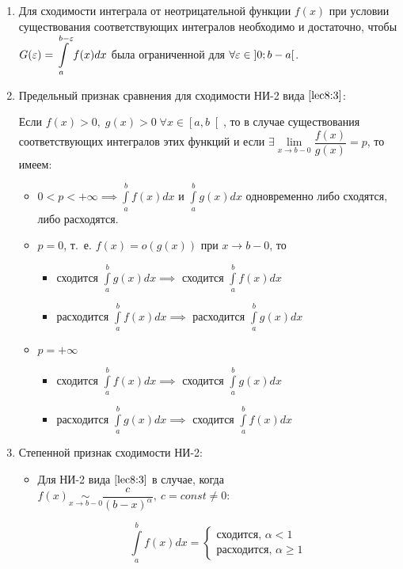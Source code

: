 \documentclass[../../main.tex]{subfiles}
\begin{document}
\begin{enumerate}
 \item Для сходимости интеграла от неотрицательной функции $f(x)$ при 
 условии существования соответствующих интегралов необходимо и 
 достаточно, чтобы $G(\varepsilon) = \displaystyle\int\limits_{a}^{b 
 - \varepsilon}f(x)dx$ была ограниченной для $\forall \varepsilon \in 
 \left]0; b - a\right[$.
 
 \item Предельный признак сравнения для сходимости НИ-2 вида 
 $\eqref{lec8:3}$:
 
 Если $f(x) > 0,\; g(x) > 0\; \forall x \in \left[a, b\right[$, то в случае 
 существования соответствующих интегралов этих функций и если 
 $\exists \underset{x \to b - 
 0}\lim\dfrac{f(x)}{g(x)} = p$, то имеем:
 \begin{itemize}
  \item[а)] $0 < p < +\infty \implies \displaystyle\int\limits_{a}^{b}f(x)dx$ 
  и $\displaystyle\int\limits_{a}^{b}g(x)dx$ одновременно либо сходятся, либо 
  расходятся.
  \item[б)] $p = 0$, т.~е. $f(x) = o(g(x))$ при $x \to b - 0$, то
  \begin{itemize}
   \item сходится $\displaystyle\int\limits_{a}^{b}g(x)dx \implies $ 
   сходится $\displaystyle\int\limits_{a}^{b}f(x)dx$
   \item расходится $\displaystyle\int\limits_{a}^{b}f(x)dx \implies $ 
   расходится $\displaystyle\int\limits_{a}^{b}g(x)dx$
  \end{itemize}
  \item[в)] $p = +\infty$
    \begin{itemize}
     \item сходится $\displaystyle\int\limits_{a}^{b}f(x)dx \implies $ 
     сходится $\displaystyle\int\limits_{a}^{b}g(x)dx$
     \item расходится $\displaystyle\int\limits_{a}^{b}g(x)dx \implies $ 
     сходится $\displaystyle\int\limits_{a}^{b}f(x)dx$
    \end{itemize}
 \end{itemize}
 \item Степенной признак сходимости НИ-2:
 \begin{itemize}
 \item Для НИ-2 вида $\eqref{lec8:3}$ в случае, когда $f(x) 
 \underset{x \to b - 0}\sim \dfrac{c}{(b - x)^ {\alpha}},\ c = const \neq 0$:

 \[\int\limits_{a}^{b} f(x)dx = \begin{cases}
                                 \text{сходится, } \alpha < 1\\
                                 \text{расходится, } \alpha \geq 1
                                \end{cases}\]
                                

\end{itemize}
\end{enumerate}
\end{document}

